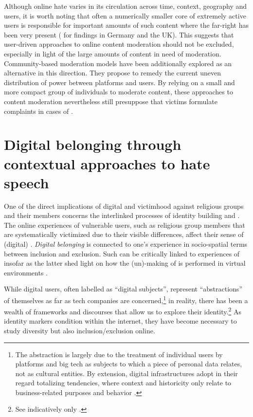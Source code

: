 \documentclass[output=paper,colorlinks,citecolor=brown]{langscibook}
\begin{document}
Although online hate varies in its circulation across time, context, geography and users, it is worth noting that often a numerically smaller core of extremely active users is responsible for important amounts of such content where the far-right has been very present (\citealt{kreissel_et_al2018,vidgen_yasseri_margetts2021} for findings in Germany and the UK). This suggests that user-driven approaches to online content moderation should not be excluded, especially in light of the large amounts of content in need of moderation. Community-based moderation models have been additionally explored as an alternative in this direction. They propose to remedy the current uneven distribution of power between platforms and users. By relying on a small and more compact group of individuals to moderate content, these approaches to content moderation nevertheless still presuppose that victims formulate complaints in cases of  \citep{hasinoff_schneider2022}.

\section{Digital belonging through contextual approaches to hate speech}\label{ch.1.2.ss.4}

\largerpage
One of the direct implications of digital  and victimhood against  religious groups and their members concerns the interlinked processes of identity building and . The online experiences of vulnerable users, such as  religious group members that are systematically victimized due to their visible differences, affect their sense of (digital) . \textit{Digital belonging} \citep{marlowe_bartley_collins2017} is connected to one's experience in socio-spatial terms between inclusion and exclusion. Such  can be critically linked to experiences of  insofar as the latter shed light on how the (un)-making of  is performed in virtual environments \citep[86]{marlowe_bartley_collins2017}. 

While digital users, often labelled as ``digital subjects'', represent ``abstractions'' of themselves as far as tech companies are concerned,\footnote{%
The abstraction is largely due to the treatment of individual users by platforms and big tech as subjects to which a piece of personal data relates, not as cultural entities. By extension, digital infrastructures adopt in their regard totalizing tendencies, where context and historicity only relate to business-related purposes and behavior \citep[2--3]{goriunova2019}.} in reality, there has been a wealth of frameworks and discourses that allow us to explore their identity.\footnote{%
See indicatively only \citet{cover2023}.} 
As identity markers condition  within the internet, they have become necessary to study diversity but also inclusion/exclusion online.
\end{document}
